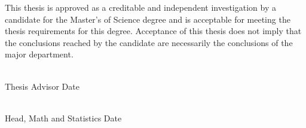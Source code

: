 \documentclass[SDSUThesis.tex]{subfiles}
\begin{document}
\begin{center}
\yourtitle
\vspace{0.5in}
\end{center}

\par This thesis is approved as a creditable and independent investigation by a candidate for the Master's of Science degree and is acceptable for meeting the thesis requirements for this degree.  Acceptance of this thesis does not imply that the conclusions reached by the candidate are necessarily the conclusions of the major department.

\vspace{1.5in}

\singlespacing

\hspace*{\fill}\underline{$~~~~~~~~~~~~~~~~~~~~~~~~~~~~~~~~~~~~~~~~~~~~~~~~~~~~$}\\
\hspace*{230bp}\youradvisor\\
\hspace*{\fill}Thesis Advisor \hspace*{97bp}Date

\vspace{1in}

\hspace*{\fill}\underline{$~~~~~~~~~~~~~~~~~~~~~~~~~~~~~~~~~~~~~~~~~~~~~~~~~~~~$}\\
\hspace*{230bp}\departmenthead\\
\hspace*{\fill}Head, Math and Statistics \hspace*{40bp}Date
\end{document}
